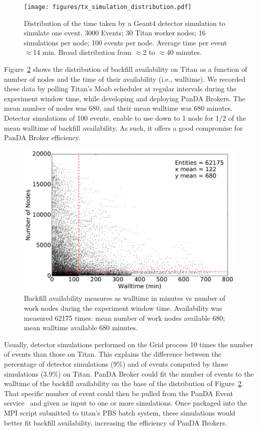 \begin{figure}[htp]
    \texttt{[image: figures/tx\_simulation\_distribution.pdf]}
    \caption{Distribution of the time taken by a Geant4 detector simulation to
    simulate one event. 3000 Events; 30 Titan worker nodes; 16 simulations per
    node; 100 events per node. Average time per event $\approx$14 min. Broad
    distribution from $\approx$2 to $\approx$40 minutes.}
\label{fig:100event-distrib}
\end{figure}

Figure~\ref{fig:backfill-distrib} shows the distribution of backfill
availability on Titan as a function of number of nodes and the time of their
availability (i.e., walltime). We recorded these data by polling Titan's Moab
scheduler at regular intervals during the experiment window time, while
developing and deploying PanDA Brokers. The mean number of nodes was 680, and
their mean walltime was 680 minutes. Detector simulations of 100 events, enable
to use down to 1 node for 1/2 of the mean walltime of backfill availability. As
such, it offers a good compromise for PanDA Broker efficiency.

\begin{figure}[htp]
    \includegraphics[clip,width=\columnwidth]{figures/titan_backfill_avail.pdf}
    \caption{Backfill availability measures as walltime in minutes vs number of
    work nodes during the experiment window time. Availability was measured
    62175 times: mean number of work nodes available 680; mean walltime
    available 680 minutes.}
\label{fig:backfill-distrib}
\end{figure}

Usually, detector simulations performed on the Grid process 10 times the number
of events than those on Titan. This explains the difference between the
percentage of detector simulations (9\%) and of events computed by those
simulations (3.9\%) on Titan. PanDA Broker could fit the number of events to the
walltime of the backfill availability on the base of the distribution of
Figure~\ref{fig:backfill-distrib}. That specific number of event could then be
pulled from the PanDA Event service~\cite{calafiura2015atlas} and given as input
to one or more simulations. Once packaged into the MPI script submitted to
titan's PBS batch system, these simulations would better fit backfill
availability, increasing the efficiency of PanDA Brokers.


